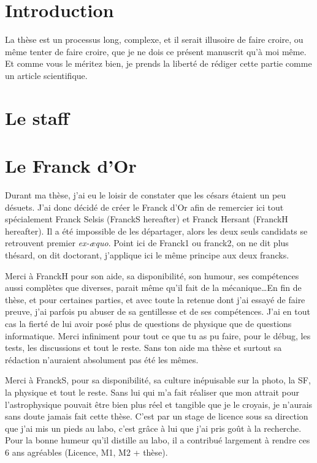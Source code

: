 \section{Introduction}
La thèse est un processus long, complexe, et il serait illusoire de faire croire, ou même tenter de faire croire, que je ne dois ce présent manuscrit qu'à moi même. Et comme vous le méritez bien, je prends la liberté de rédiger cette partie comme un article scientifique. 

\section{Le staff}


\section{Le Franck d'Or}
Durant ma thèse, j'ai eu le loisir de constater que les césars étaient un peu désuets. J'ai donc décidé de créer le Franck d'Or afin de remercier ici tout spécialement Franck Selsis (FranckS hereafter) et Franck Hersant (FranckH hereafter). Il a été impossible de les départager, alors les deux seuls candidats se retrouvent premier \textit{ex-æquo}. Point ici de Franck1 ou franck2, on ne dit plus thésard, on dit doctorant, j'applique ici le même principe aux deux francks. 

Merci à FranckH pour son aide, sa disponibilité, son humour, ses compétences aussi complètes que diverses, parait même qu'il fait de la mécanique\dots En fin de thèse, et pour certaines parties, et avec toute la retenue dont j'ai essayé de faire preuve, j'ai parfois pu abuser de sa gentillesse et de ses compétences. J'ai en tout cas la fierté de lui avoir posé plus de questions de physique que de questions informatique. Merci infiniment pour tout ce que tu as pu faire, pour le débug, les tests, les discussions et tout le reste. Sans ton aide ma thèse et surtout sa rédaction n'auraient absolument pas été les mêmes. 

Merci à FranckS, pour sa disponibilité, sa culture inépuisable sur la photo, la SF, la physique et tout le reste. Sans lui qui m'a fait réaliser que mon attrait pour l'astrophysique pouvait être bien plus réel et tangible que je le croyais, je n'aurais sans doute jamais fait cette thèse. C'est par un stage de licence sous sa direction que j'ai mis un pieds au labo, c'est grâce à lui que j'ai pris goût à la recherche. Pour la bonne humeur qu'il distille au labo, il a contribué largement à rendre ces 6 ans agréables (Licence, M1, M2 + thèse).

